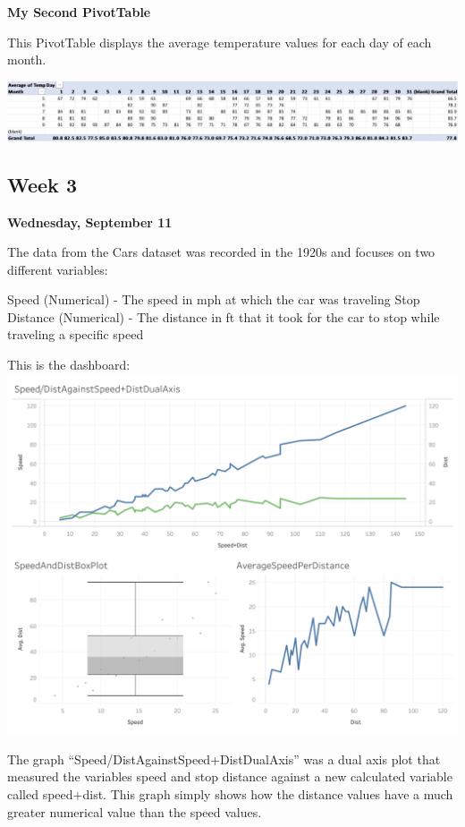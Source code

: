\documentclass[
  letterpaper,
  DIV=11,
  numbers=noendperiod]{scrreprt}
\begin{document}
\textbf{My Second PivotTable}

This PivotTable displays the average temperature values for each day of
each month.

\includegraphics{PivotTable2_Average_Temp_Pena.png}

\subsection{Week 3}\label{week-3}

\textbf{Wednesday, September 11}

The data from the Cars dataset was recorded in the 1920s and focuses on
two different variables:

Speed (Numerical) - The speed in mph at which the car was traveling Stop
Distance (Numerical) - The distance in ft that it took for the car to
stop while traveling a specific speed

This is the dashboard: \includegraphics{CarsDatasetDashboard.png}

The graph ``Speed/DistAgainstSpeed+DistDualAxis'' was a dual axis plot
that measured the variables speed and stop distance against a new
calculated variable called speed+dist. This graph simply shows how the
distance values have a much greater numerical value than the speed
values.
\end{document}
